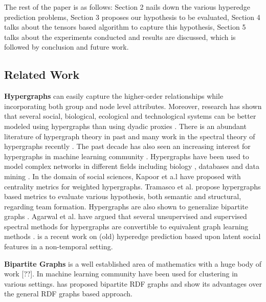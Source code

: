 \documentclass{sig-alternate}
\begin{document}
The rest of the paper is as follows: Section 2 nails down the various hyperedge prediction problems, Section 3 proposes our hypothesis to be evaluated, Section 4 talks about the tensors based algorithm to capture this hypothesis, Section 5 talks about the experiments conducted and results are discussed, which is followed by conclusion and future work.

\subsection{Related Work}

\textbf{Hypergraphs} can easily capture the higher-order relationships while incorporating both group and node level attributes. Moreover, research has shown that several social, biological, ecological and technological systems can be better modeled using hypergraphs than using dyadic proxies \cite{estrada2005complex}. There is an abundant literature of hypergraph theory in past \cite{berge1973graphs} and many work in the spectral theory of hypergraphs recently \cite{pearson2012spectral}\cite{xie2013h}. The past decade has also seen an increasing interest for hypergraphs in machine learning community \cite{Zhou07}\cite{tian2009hypergraph}. Hypergraphs have been used to model complex networks in different fields including biology \cite{klamt2009hypergraphs}, databases \cite{fagin1983degrees} and data mining \cite{han1998hypergraph}. In the domain of social sciences, Kapoor et a.l \cite{dhruv2013} have proposed with centrality metrics for weighted hypergraphs. Tramasco et al. \cite{taramasco2010academic} propose hypergraphs based metrics to evaluate various hypothesis, both semantic and structural, regarding team formation. Hypergraphs are also shown to generalize bipartite graphs \cite{berge1984hypergraphs}. Agarwal et al. have argued that several unsupervised and supervised spectral methods for hypergraphs are convertible to equivalent graph learning methods \cite{agarwal2008}. \cite{latent2013} is a recent work on (old) hyperedge prediction based upon latent social features in a non-temporal setting.

\textbf{Bipartite Graphs} is a well established area of mathematics with a huge body of work [??]. In machine learning community have been used for clustering in various settings\cite{clusteringdhillon}\cite{clustering2}\cite{clustering3}. \cite{RDF} has proposed bipartite RDF graphs and show its advantages over the general RDF graphs based approach.

\end{document}
